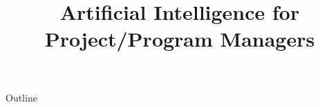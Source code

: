 \documentclass[xcolor=dvipsnames,compress,t,pdf,notes,9pt]{beamer}
\title[\insertframenumber /\inserttotalframenumber]{Artificial Intelligence for Project/Program Managers}
\begin{document}
	\begin{frame}
	\titlepage
	\end{frame}

	\begin{frame}{Outline}
	    \tableofcontents
	\end{frame}

	
	
	
	
	
	
\end{document}
